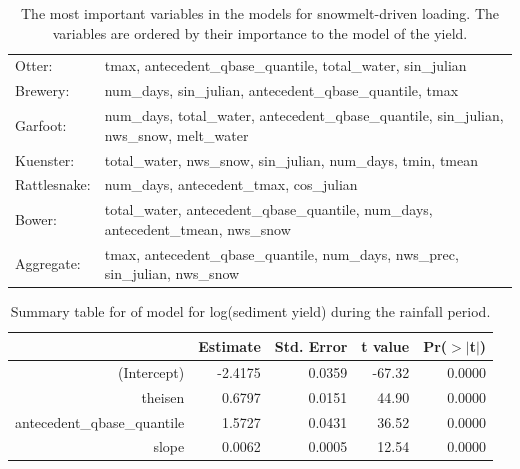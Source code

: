 \documentclass[10pt]{article}
\begin{document}
\begin{table}[h!]
\begin{center}
\begin{tabular}{ll}
        \hspace{5mm} Otter: & tmax, antecedent\_qbase\_quantile, total\_water, sin\_julian\\
        \hspace{5mm} Brewery: & num\_days, sin\_julian, antecedent\_qbase\_quantile, tmax\\
        \hspace{5mm} Garfoot: & num\_days, total\_water, antecedent\_qbase\_quantile, sin\_julian, nws\_snow, melt\_water\\
        \hspace{5mm} Kuenster: & total\_water, nws\_snow, sin\_julian, num\_days, tmin, tmean\\
        \hspace{5mm} Rattlesnake: & num\_days, antecedent\_tmax, cos\_julian\\
        \hspace{5mm} Bower: & total\_water, antecedent\_qbase\_quantile, num\_days, antecedent\_tmean, nws\_snow\\
        \hspace{5mm} Aggregate: & tmax, antecedent\_qbase\_quantile, num\_days, nws\_prec, sin\_julian, nws\_snow\\
    \end{tabular}
    \caption{The most important variables in the models for snowmelt-driven loading. The variables are ordered by their importance to the model of the yield. \label{snow_predictor_list}}
    \end{center}
\end{table}


\begin{table}[ht]
\begin{center}
\begin{tabular}{rrrrr}
  \hline
 & Estimate & Std. Error & t value & Pr($>$$|$t$|$) \\ 
  \hline
(Intercept) & -2.4175 & 0.0359 & -67.32 & 0.0000 \\ 
  theisen & 0.6797 & 0.0151 & 44.90 & 0.0000 \\ 
  antecedent\_qbase\_quantile & 1.5727 & 0.0431 & 36.52 & 0.0000 \\ 
  slope & 0.0062 & 0.0005 & 12.54 & 0.0000 \\ 
   \hline
\end{tabular}
\caption{Summary table for of model for log(sediment yield) during the rainfall period.}
\end{center}
\end{table}
\end{document}
